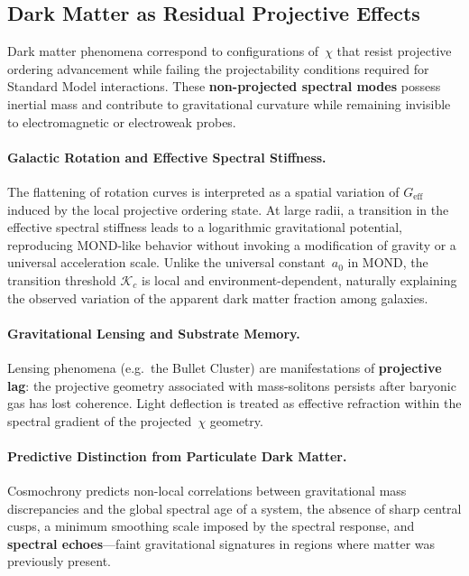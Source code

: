 \subsection{Dark Matter as Residual Projective Effects}
  \label{subsec:dark-matter-phenomenology}

  Dark matter phenomena correspond to configurations of~$\chi$ that resist
  projective ordering advancement while failing the projectability conditions
  required for Standard Model interactions.
  These \textbf{non-projected spectral modes} possess inertial mass and
  contribute to gravitational curvature while remaining invisible to
  electromagnetic or electroweak probes.

  \paragraph{Galactic Rotation and Effective Spectral Stiffness.}
    The flattening of rotation curves is interpreted as a spatial variation of
    $G_{\mathrm{eff}}$ induced by the local projective ordering state.
    At large radii, a transition in the effective spectral stiffness leads to
    a logarithmic gravitational potential, reproducing MOND-like behavior
    without invoking a modification of gravity or a universal acceleration
    scale.
    Unlike the universal constant~$a_0$ in MOND, the transition threshold
    $\mathcal{K}_c$ is local and environment-dependent, naturally explaining
    the observed variation of the apparent dark matter fraction among
    galaxies.

  \paragraph{Gravitational Lensing and Substrate Memory.}
    Lensing phenomena (e.g.\ the Bullet Cluster) are manifestations of
    \textbf{projective lag}: the projective geometry associated with
    mass-solitons persists after baryonic gas has lost coherence.
    Light deflection is treated as effective refraction within the spectral
    gradient of the projected~$\chi$ geometry.

  \paragraph{Predictive Distinction from Particulate Dark Matter.}
    Cosmochrony predicts non-local correlations between gravitational mass
    discrepancies and the global spectral age of a system, the absence of
    sharp central cusps, a minimum smoothing scale imposed by the spectral
    response, and \textbf{spectral echoes}---faint gravitational signatures
    in regions where matter was previously present.
